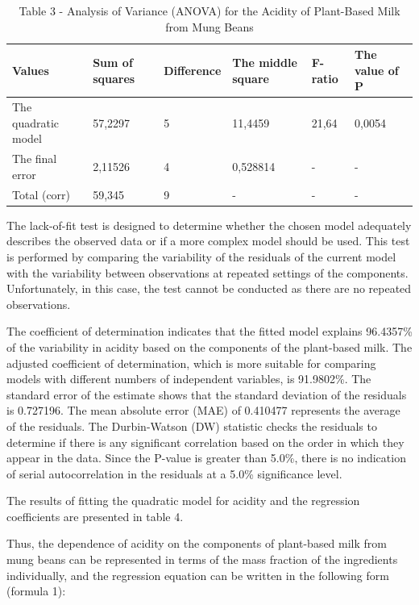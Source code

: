 \begin{table}[H]
\caption*{Table 3 - Analysis of Variance (ANOVA) for the Acidity of Plant-Based Milk from Mung Beans}
\centering
\begin{tabular}{|l|l|l|l|l|l|}
\hline
Values              & Sum of squares & Difference & The middle square & F-ratio & The value of P \\ \hline
The quadratic model & 57,2297        & 5          & 11,4459           & 21,64   & 0,0054         \\ \hline
The final error     & 2,11526        & 4          & 0,528814          & -       & -              \\ \hline
Total (corr)        & 59,345         & 9          & -                 & -       & -              \\ \hline
\end{tabular}
\end{table}

\begin{multicols}{2}

The lack-of-fit test is designed to determine whether the chosen model
adequately describes the observed data or if a more complex model should
be used. This test is performed by comparing the variability of the
residuals of the current model with the variability between observations
at repeated settings of the components. Unfortunately, in this case, the
test cannot be conducted as there are no repeated observations.

The coefficient of determination indicates that the fitted model
explains 96.4357\% of the variability in acidity based on the components
of the plant-based milk. The adjusted coefficient of determination,
which is more suitable for comparing models with different numbers of
independent variables, is 91.9802\%. The standard error of the estimate
shows that the standard deviation of the residuals is 0.727196. The mean
absolute error (MAE) of 0.410477 represents the average of the
residuals. The Durbin-Watson (DW) statistic checks the residuals to
determine if there is any significant correlation based on the order in
which they appear in the data. Since the P-value is greater than 5.0\%,
there is no indication of serial autocorrelation in the residuals at a
5.0\% significance level.

The results of fitting the quadratic model for acidity and the
regression coefficients are presented in table 4.


Thus, the dependence of acidity on the components of plant-based milk
from mung beans can be represented in terms of the mass fraction of the
ingredients individually, and the regression equation can be written in
the following form (formula 1):

\end{multicols}


